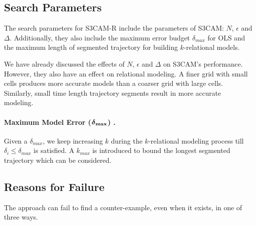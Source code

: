 





\subsection{Search Parameters}

The search parameters for S3CAM-R include the parameters of S3CAM:
$N$, $\epsilon$ and $\Delta$. Additionally, they also include the
maximum error budget $\delta_{max}$ for OLS and the maximum length of
segmented trajectory for building $k$-relational models.

We have already discussed the effects of $N$, $\epsilon$ and $\Delta$
on S3CAM's performance. However, they also have an effect on
relational modeling. A finer grid with small cells produces more
accurate models than a coarser grid with large cells. Similarly,
small time length trajectory segments result in more accurate
modeling.

\paragraph{Maximum Model Error ($\boldsymbol{\delta}_{\bold{max}}$) .}
Given a $\delta_{max}$, we keep increasing $k$ during the
$k$-relational modeling process till $\delta_i \le \delta_{max}$ is
satisfied. A $k_{max}$ is introduced to bound the longest
segmented trajectory which can be considered.


\subsection{Reasons for Failure}
The approach can fail to find a counter-example, even when it exists, in
one of three ways.

